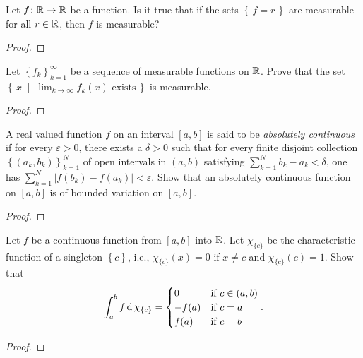 \begin{problem}
Let $f\colon\mathbb{R}\to\mathbb{R}$ be a function. Is it true that if the sets
$\left\{\,f=r\,\right\}$ are measurable for all $r\in\mathbb{R}$, then $f$ is
measurable?
\end{problem}
\begin{proof}
\end{proof}

\begin{problem}
Let $\left\{f_k\right\}_{k=1}^\infty$ be a sequence of measurable functions
on $\mathbb{R}$. Prove that the set
$\left\{\,x\;\middle|\;\text{$\lim_{k\to\infty} f_k(x)$ exists}\,\right\}$
is measurable.
\end{problem}
\begin{proof}
\end{proof}

\begin{problem}
A real valued function $f$ on an interval $[a,b]$ is said to be
\emph{absolutely continuous} if for every $\varepsilon>0$, there exists a
$\delta>0$ such that for every finite disjoint collection
$\left\{(a_k,b_k)\right\}_{k=1}^N$ of open intervals in $(a,b)$ satisfying
$\sum_{k=1}^Nb_k-a_k<\delta$, one has
$\sum_{k=1}^N\left|f(b_k)-f(a_k)\right|<\varepsilon$. Show that an
absolutely continuous function on $[a,b]$ is of bounded variation on
$[a,b]$.
\end{problem}
\begin{proof}
\end{proof}

\begin{problem}
Let $f$ be a continuous function from $[a,b]$ into $\mathbb{R}$. Let
$\chi_{\{c\}}$ be the characteristic function of a singleton
$\left\{c\right\}$, i.e., $\chi_{\{c\}}(x)=0$ if $x\neq c$ and
$\chi_{\{c\}}(c)=1$. Show that
\[
\int_a^b f\operatorname{d}\chi_{\{c\}}=
\begin{cases}
0&\text{if $c\in(a,b)$}\\
-f(a)&\text{if $c=a$}\\
f(a)&\text{if $c=b$}
\end{cases}.
\]
\end{problem}
\begin{proof}
\end{proof}


